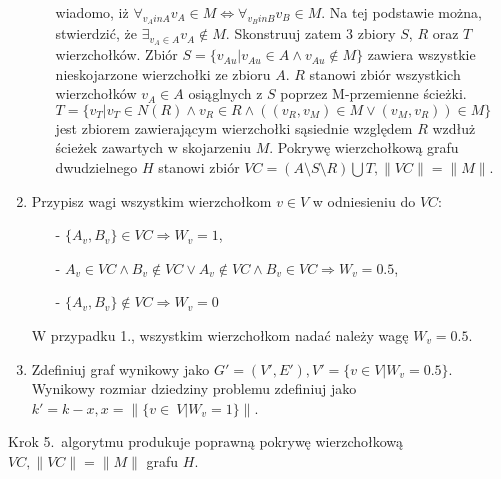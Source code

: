 \begin{enumerate}
\begin{itemize}
        wiadomo, iż ${\forall_{v_A in A}{v_A \in M} \iff \forall_{v_B in B}{v_B \in M}}$.
        Na tej podstawie można, stwierdzić, że $\exists_{v_A \in A}{v_A \notin
        M}$.
        Skonstruuj zatem 3 zbiory $S$, $R$ oraz $T$ wierzchołków. Zbiór
        $S = \{v_{Au}|v_{Au} \in A \land v_{Au} \notin M\}$ zawiera wszystkie
        nieskojarzone wierzchołki ze zbioru $A$.
        $R$ stanowi zbiór wszystkich wierzchołków $v_A \in A$ osiąglnych z $S$
        poprzez M-przemienne ścieżki. \\
        $T=\{v_T|v_T \in N(R) \land v_R \in R \land ((v_R,v_M) \in M \lor (v_M,v_R)) \in M\}$ 
        jest zbiorem zawierającym wierzchołki sąsiednie względem $R$ wzdłuż 
        ścieżek zawartych w skojarzeniu $M$.
        Pokrywę wierzchołkową grafu dwudzielnego $H$ stanowi zbiór 
        ${VC=(A \setminus S \setminus R) \bigcup T}, \|VC\|=\|M\|$.
    \end{itemize}
  \item Przypisz wagi wszystkim wierzchołkom $v \in V$ w odniesieniu do $VC$:
    \begin{itemize}
      \item[-] $\{A_v, B_v\} \in VC \Rightarrow W_v=1$,
      \item[-] $A_v \in VC \land B_v \notin VC \lor A_v \notin VC \land B_v \in
        VC \Rightarrow W_v=0.5$,
      \item[-] $\{A_v, B_v\} \notin VC \Rightarrow W_v=0$
    \end{itemize}
    W przypadku 1., wszystkim wierzchołkom nadać należy wagę $W_v=0.5$.
  \item Zdefiniuj graf wynikowy jako 
    $G\prime=(V\prime, E\prime), V\prime=\{v \in V|W_v=0.5\}$.
    Wynikowy rozmiar dziedziny problemu zdefiniuj jako 
    ${k\prime=k-x, x=\|\{v\in~V|W_v=1\}}\|$.
\end{enumerate}

\begin{theorem}
  Krok 5.\ algorytmu produkuje poprawną pokrywę wierzchołkową $VC, \|VC\|=\|M\|$
  grafu $H$.
\end{theorem}

